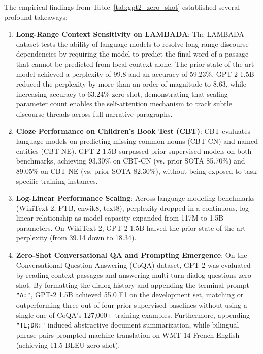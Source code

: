 \documentclass[../../../main.tex]{subfiles}
\begin{document}
The empirical findings from Table~\ref{tab:gpt2_zero_shot} established several profound takeaways:
\begin{enumerate}
    \item \textbf{Long-Range Context Sensitivity on LAMBADA}: The LAMBADA dataset tests the ability of language models to resolve long-range discourse dependencies by requiring the model to predict the final word of a passage that cannot be predicted from local context alone. The prior state-of-the-art model achieved a perplexity of 99.8 and an accuracy of 59.23\%. GPT-2 1.5B reduced the perplexity by more than an order of magnitude to 8.63, while increasing accuracy to 63.24\% zero-shot, demonstrating that scaling parameter count enables the self-attention mechanism to track subtle discourse threads across full narrative paragraphs.
    
    \item \textbf{Cloze Performance on Children's Book Test (CBT)}: CBT evaluates language models on predicting missing common nouns (CBT-CN) and named entities (CBT-NE). GPT-2 1.5B surpassed prior supervised models on both benchmarks, achieving 93.30\% on CBT-CN (vs. prior SOTA 85.70\%) and 89.05\% on CBT-NE (vs. prior SOTA 82.30\%), without being exposed to task-specific training instances.
    
    \item \textbf{Log-Linear Performance Scaling}: Across language modeling benchmarks (WikiText-2, PTB, enwik8, text8), perplexity dropped in a continuous, log-linear relationship as model capacity expanded from 117M to 1.5B parameters. On WikiText-2, GPT-2 1.5B halved the prior state-of-the-art perplexity (from 39.14 down to 18.34).
    
    \item \textbf{Zero-Shot Conversational QA and Prompting Emergence}: On the Conversational Question Answering (CoQA) dataset, GPT-2 was evaluated by reading context passages and answering multi-turn dialog questions zero-shot. By formatting the dialog history and appending the terminal prompt \texttt{"A:"}, GPT-2 1.5B achieved 55.0 F1 on the development set, matching or outperforming three out of four prior supervised baselines without using a single one of CoQA's 127,000+ training examples. Furthermore, appending \texttt{"TL;DR:"} induced abstractive document summarization, while bilingual phrase pairs prompted machine translation on WMT-14 French-English (achieving 11.5 BLEU zero-shot).
\end{enumerate}
\end{document}
